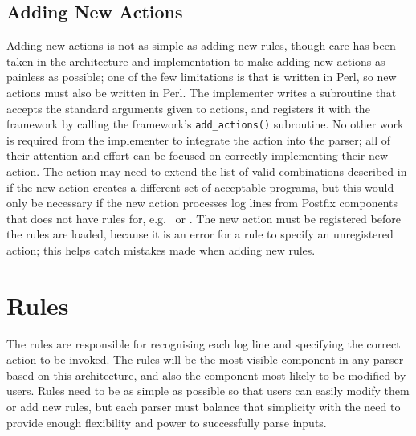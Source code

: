 \subsection{Adding New Actions}

\label{adding new actions in implementation}

Adding new actions is not as simple as adding new rules, though care has
been taken in the architecture and implementation to make adding new
actions as painless as possible; one of the few limitations is that
\parsername{} is written in Perl, so new actions must also be written in
Perl.  The implementer writes a subroutine that accepts the standard
arguments given to actions, and registers it with the framework by calling
the framework's \texttt{add\_actions()} subroutine.  No other work is
required from the implementer to integrate the action into the parser; all
of their attention and effort can be focused on correctly implementing
their new action.  The action may need to extend the list of valid
combinations described in  if the new
action creates a different set of acceptable programs, but this would only
be necessary if the new action processes log lines from Postfix components
that \parsername{} does not have rules for, e.g.\  or
.  The new action must be registered before the rules are
loaded, because it is an error for a rule to specify an unregistered
action; this helps catch mistakes made when adding new rules.

\section{Rules}

\label{rules in implementation}

The rules are responsible for recognising each log line and specifying the
correct action to be invoked.  The rules will be the most visible component
in any parser based on this architecture, and also the component most
likely to be modified by users.  Rules need to be as simple as possible so
that users can easily modify them or add new rules, but each parser must
balance that simplicity with the need to provide enough flexibility and
power to successfully parse inputs.

